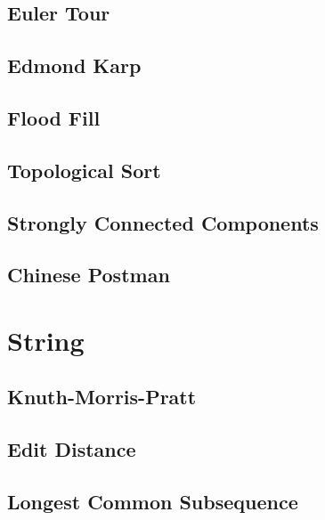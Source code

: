 \documentclass[a4paper,landscape,8pt]{article}
\begin{document}
\begin{multicols}{2}
\subsection{Euler Tour}


\subsection{Edmond Karp}


\subsection{Flood Fill}


\subsection{Topological Sort}


\subsection{Strongly Connected Components}


\subsection{Chinese Postman}



\section{String}

\subsection{Knuth-Morris-Pratt}


\subsection{Edit Distance}


\subsection{Longest Common Subsequence}



\end{multicols}
\end{document}
